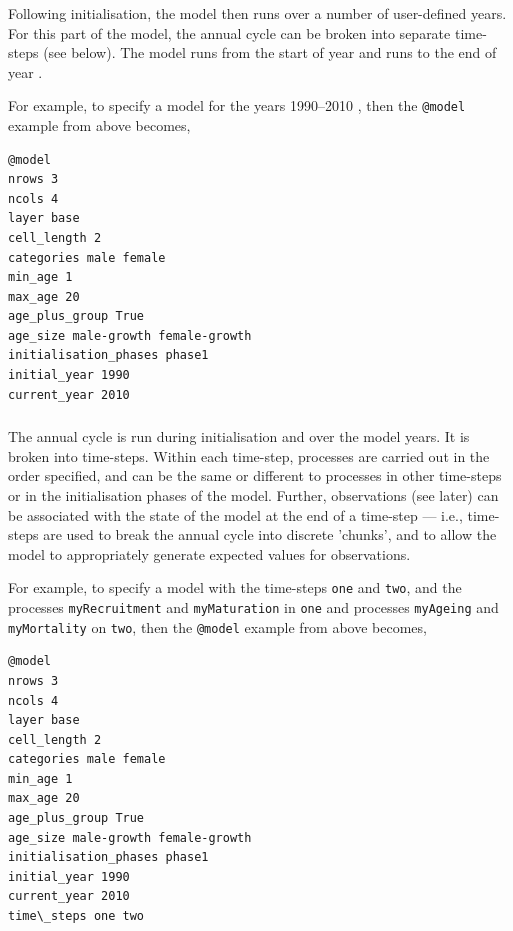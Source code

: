 \subsubsection{}

Following initialisation, the model then runs over a number of user-defined years. For this part of the model, the annual cycle can be broken into separate time-steps (see below). The model runs from the start of year  and runs to the end of year . %

For example, to specify a model for the years 1990--2010 , then the \texttt{@model} example from above becomes,
{\small{\begin{verbatim}
@model
nrows 3
ncols 4
layer base
cell_length 2
categories male female
min_age 1
max_age 20
age_plus_group True
age_size male-growth female-growth
initialisation_phases phase1
initial_year 1990
current_year 2010
\end{verbatim}}}

%

\subsubsection{}

The annual cycle is run during initialisation and over the model years. It is broken into time-steps. Within each time-step, processes are carried out in the order specified, and can be the same or different to processes in other time-steps or in the initialisation phases of the model. Further, observations (see later) can be associated with the state of the model at the end of a time-step --- i.e., time-steps are used to break the annual cycle into discrete 'chunks', and to allow the model to appropriately generate expected values for observations. 

For example, to specify a model with the time-steps \texttt{one} and \texttt{two}, and the processes \texttt{myRecruitment} and \texttt{myMaturation} in \texttt{one} and processes \texttt{myAgeing} and \texttt{myMortality} on \texttt{two}, then the \texttt{@model} example from above becomes,
{\small{\begin{verbatim}
@model
nrows 3
ncols 4
layer base
cell_length 2
categories male female
min_age 1
max_age 20
age_plus_group True
age_size male-growth female-growth
initialisation_phases phase1
initial_year 1990
current_year 2010
time\_steps one two
\end{verbatim}}}


